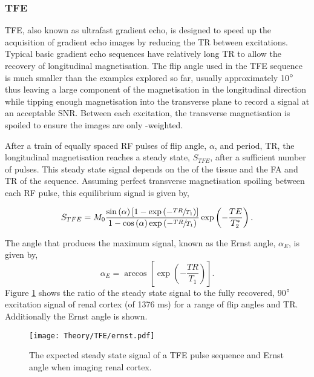 \subsubsection{\ac*{TFE}}
\ac{TFE}, also known as ultrafast gradient echo, is designed to speed up the acquisition of gradient echo images by reducing the \ac{TR} between excitations. Typical basic gradient echo sequences have relatively long \ac{TR} to allow the recovery of longitudinal magnetisation. The flip angle used in the \ac{TFE} sequence is much smaller than the examples explored so far, usually approximately 10$\degree$ thus leaving a large component of the magnetisation in the longitudinal direction while tipping enough magnetisation into the transverse plane to record a signal at an acceptable \ac{SNR}. Between each excitation, the transverse magnetisation is spoiled to ensure the images are only \tone-weighted. 

After a train of equally spaced \ac{RF} pulses of flip angle, $\alpha$, and period, \ac{TR}, the longitudinal magnetisation reaches a steady state, $S_{TFE}$, after a sufficient number of pulses. This steady state signal depends on the \tone of the tissue and the \ac{FA} and \ac{TR} of the sequence. Assuming perfect transverse magnetisation spoiling between each \ac{RF} pulse, this equilibrium signal is given by,

\begin{equation}
	S_{TFE} = M_0 \frac{\sin \left( \alpha \right) \left[ 1 - \exp \left( -\sfrac{TR}{T_1}\right) \right]}{1-\cos \left( \alpha \right) \exp \left( -\sfrac{TR}{T_1}\right)} \exp \left( - \frac{TE}{T_2^*}\right).
	\label{eq:tfe_signal}
\end{equation}

The angle that produces the maximum signal, known as the Ernst angle, $\alpha_E$, is given by,
\begin{equation}
	\alpha_E = \arccos \left[ \exp \left( -\frac{TR}{T_1}\right)\right].
	\label{eq:theory_ernst}
\end{equation}
Figure \ref{fig:theory_ernst} shows the ratio of the steady state signal to the fully recovered, 90$\degree${ } excitation signal of renal cortex (\tone of 1376 ms) for a range of flip angles and \ac{TR}. Additionally the Ernst angle is shown. 
\begin{figure}[H]
	\centering
	\texttt{[image: Theory/TFE/ernst.pdf]}
	\caption{The expected steady state signal of a \ac{TFE} pulse sequence and Ernst angle when imaging renal cortex.}
	\label{fig:theory_ernst}	
\end{figure}


